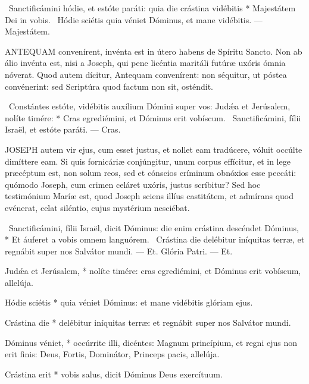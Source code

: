 \R\ Sanctificámini hódie, et estóte paráti: quia die crástina vidébitis * Majestátem Dei in vobis. \V\ Hódie sciétis quia véniet Dóminus, et mane vidébitis. --- Majestátem.


\lettrine[lines=2]{A}{NTEQUAM} convenírent, invénta est in útero habens de Spíritu Sancto. Non ab álio invénta est, nisi a Joseph, qui pene licéntia maritáli futúræ uxóris ómnia nóverat. Quod autem dícitur, Antequam convenírent: non séquitur, ut póstea convénerint: sed Scriptúra quod factum non sit, osténdit.

\R\ Constántes estóte, vidébitis auxílium Dómini super vos: Judǽa et Jerúsalem, nolíte timére: * Cras egrediémini, et Dóminus erit vobíscum. \V\ Sanctificámini, fílii Israël, et estóte paráti. --- Cras.


\lettrine[lines=2]{J}{OSEPH} autem vir ejus, cum esset justus, et nollet eam tradúcere, vóluit occúlte dimíttere eam. Si quis fornicáriæ conjúngitur, unum corpus effícitur, et in lege præcéptum est, non solum reos, sed et cónscios críminum obnóxios esse peccáti: quómodo Joseph, cum crimen celáret uxóris, justus scríbitur? Sed hoc testimónium Maríæ est, quod Joseph sciens illíus castitátem, et admírans quod evénerat, celat siléntio, cujus mystérium nesciébat.

\R\ Sanctificámini, fílii Israël, dicit Dóminus: die enim crástina descéndet Dóminus, * Et áuferet a vobis omnem languórem. \V\ Crástina die delébitur iníquitas terræ, et regnábit super nos Salvátor mundi. --- Et. Glória Patri. --- Et.


 

 Judǽa et Jerúsalem, * nolíte timére: cras egrediémini, et Dóminus erit vobíscum, allelúja.


 Hódie sciétis * quia véniet Dóminus: et mane vidébitis glóriam ejus.

 Crástina die * delébitur iníquitas terræ: et regnábit super nos Salvátor mundi.

 Dóminus véniet, * occúrrite illi, dicéntes: Magnum princípium, et regni ejus non erit finis: Deus, Fortis, Dominátor, Princeps pacis, allelúja.

 Crástina erit * vobis salus, dicit Dóminus Deus exercítuum.

